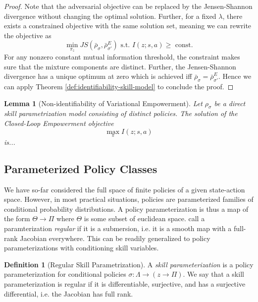 \documentclass{article}
\theoremstyle{plain}
\newtheorem{lemma}[theorem]{Lemma}
\theoremstyle{definition}
\newtheorem{definition}[theorem]{Definition}
\theoremstyle{remark}
\begin{document}
\begin{proof}
    Note that the adversarial objective can be replaced by the Jensen-Shannon divergence without changing the optimal solution. Further, for a fixed $\lambda$, there exists a constrained objective with the same solution set, meaning we can rewrite the objective as
    \begin{equation}
        \min_{\pi_z} JS(\bar\rho_\sigma, \bar\rho_{\sigma'}^E) \text{ s.t. } I(z; s,a) \geq \text{ const.}
    \end{equation}
    For any nonzero constant mutual information threshold, the constraint makes sure that the mixture components are distinct. Further, the Jensen-Shannon divergence has a unique optimum at zero which is achieved iff $\bar\rho_\sigma = \bar\rho_{\sigma'}^E$. Hence we can apply Theorem \ref{def:identifiability-skill-model} to conclude the proof.
\end{proof}

\begin{lemma}[Non-identifiability of Variational Empowerment]
    Let $\rho_\sigma$ be a direct skill parametrization model consisting of distinct policies. The solution of the Closed-Loop Empowerment objective
    $$
        \max_{\pi} I(z; s,a)
    $$
    is...
\end{lemma}

\subsection{Parameterized Policy Classes}
We have so-far considered the full space of finite policies of a given state-action space. However, in most practical situations, policies are parameterized families of conditional probability distributions. A policy parameterization is thus a map of the form
$\Theta\to\Pi$ where $\Theta$ is some subset of euclidean space.
\citep{muller2023geometry} call a paramterization \emph{regular} if it is a submersion, i.e. it is a smooth map with a full-rank Jacobian everywhere. This can be readily generalized to policy parameterizations with conditioning skill variables.

\begin{definition}[Regular Skill Parametrization]
    A \emph{skill parameterization} is a policy parameterization for conditional policies $\sigma: \Lambda \to (z \to \Pi)$. We say that a skill parameterization is regular if it is differentiable, surjective, and has a surjective differential, i.e. the Jacobian has full rank.
\end{definition}
\end{document}
